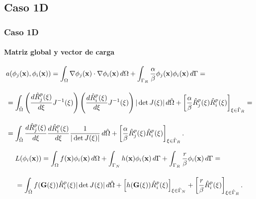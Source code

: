 \documentclass[compress]{beamer}
\begin{document}
\subsection{Caso 1D}

\begin{frame}
	\frametitle{Caso 1D}
	\framesubtitle{Matriz global y vector de carga}
	\scriptsize
	\vspace{-10pt}
	\begin{definition}
		\vspace{-10pt}
		\begin{align*}
			\vspace{-10pt}
			&a(\phi_j(\mathbf{x}),\phi_i(\mathbf{x})) = \int_{\Omega}\nabla \phi_j(\mathbf{x}) \cdot \nabla \phi_i(\mathbf{x}) \, d\Omega + \int_{\Gamma_R}\frac{\alpha}{\beta}\phi_j(\mathbf{x})\phi_i(\mathbf{x}) \, d\Gamma =\\[10pt]
			\vspace{-10pt}
			&= \int_{\hat{\Omega}} \left( \frac{d\hat{R}_{j}^p(\xi)}{d\xi} J^{-1}(\xi) \right) \left( \frac{d\hat{R}_{i}^p(\xi)}{d\xi} J^{-1}(\xi) \right) |\det J(\xi)| \, d\hat{\Omega} + \left[ \frac{\alpha}{\beta}\hat{R}_{j}^p(\xi)\hat{R}_{i}^p(\xi) \right]_{\xi \in \hat{\Gamma}_R}= \\[10pt]
			\vspace{-10pt}
			&= \int_{\hat{\Omega}} \frac{d\hat{R}_{j}^p(\xi)}{d\xi} \frac{d\hat{R}_{i}^p(\xi)}{d\xi} \frac{1}{|\det J(\xi)|} \, d\hat{\Omega} + \left[ \frac{\alpha}{\beta}\hat{R}_{j}^p(\xi)\hat{R}_{i}^p(\xi) \right]_{\xi \in \hat{\Gamma}_R}.
		\end{align*}
	\end{definition}

	\begin{definition}
		\vspace{-10pt}
		\begin{align*}
			\vspace{-10pt}
			&L(\phi_i(\mathbf{x})) = \int_{\Omega}f(\mathbf{x})\phi_i(\mathbf{x}) \, d\Omega + \int_{\Gamma_N}h(\mathbf{x})\phi_i(\mathbf{x}) \, d\Gamma + \int_{\Gamma_R}\frac{r}{\beta}\phi_i(\mathbf{x}) \, d\Gamma =\\[10pt]
			\vspace{-10pt}
			&= \int_{\hat{\Omega}}f(\mathbf{G}(\xi))\hat{R}_i^p(\xi)|\det J(\xi)| \, d\hat{\Omega} + \left[ h(\mathbf{G}(\xi))\hat{R}_i^p(\xi) \right]_{\xi \in \hat{\Gamma}_N} + \left[ \frac{r}{\beta}\hat{R}_i^p(\xi) \right]_{\xi \in \hat{\Gamma}_R}.
		\end{align*}
	\end{definition}
\end{frame}
\end{document}
